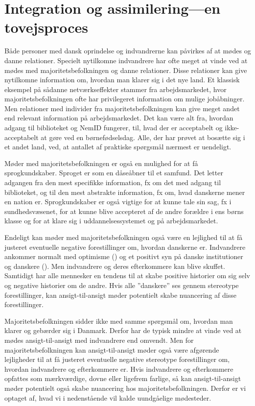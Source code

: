 \documentclass[
]{book}
\begin{document}
\section{Integration og assimilering---en tovejsproces}\label{integration-og-assimileringen-tovejsproces}

Både personer med dansk oprindelse og indvandrerne kan påvirkes af at mødes og danne relationer. Specielt nytilkomne indvandrere har ofte meget at vinde ved at mødes med majoritetsbefolkningen og danne relationer. Disse relationer kan give nytilkomne information om, hvordan man klarer sig i det nye land. Et klassisk eksempel på sådanne netværkseffekter stammer fra arbejdsmarkedet, hvor majoritetsbefolkningen ofte har privilegeret information om mulige jobåbninger. Men relationer med individer fra majoritetsbefolkningen kan give meget andet end relevant information på arbejdsmarkedet. Det kan være alt fra, hvordan adgang til biblioteket og NemID fungerer, til, hvad der er acceptabelt og ikke-acceptabelt at gøre ved en børnefødselsdag. Alle, der har prøvet at bosætte sig i et andet land, ved, at antallet af praktiske spørgsmål nærmest er uendeligt.

Møder med majoritetsbefolkningen er også en mulighed for at få sprogkundskaber. Sproget er som en dåseåbner til et samfund. Det letter adgangen fra den mest specifikke information, fx om det med adgang til biblioteket, og til den mest abstrakte information, fx om, hvad danskerne mener en nation er. Sprogkundskaber er også vigtige for at kunne tale sin sag, fx i sundhedsvæsenet, for at kunne blive accepteret af de andre forældre i ens børns klasse og for at klare sig i uddannelsessystemet og på arbejdsmarkedet.

Endeligt kan møder med majoritetsbefolkningen også være en lejlighed til at få justeret eventuelle negative forestillinger om, hvordan danskerne er. Indvandrere ankommer normalt med optimisme () og et positivt syn på danske institutioner og danskere (). Men indvandrere og deres efterkommere kan blive skuffet. Samtidigt har alle mennesker en tendens til at skabe positive historier om sig selv og negative historier om de andre. Hvis alle ''danskere'' ses gennem stereotype forestillinger, kan ansigt-til-ansigt møder potentielt skabe nuancering af disse forestillinger.

Majoritetsbefolkningen sidder ikke med samme spørgsmål om, hvordan man klarer og gebærder sig i Danmark. Derfor har de typisk mindre at vinde ved at mødes ansigt-til-ansigt med indvandrere end omvendt. Men for majoritetsbefolkningen kan ansigt-til-ansigt møder også være afgørende lejligheder til at få justeret eventuelle negative stereotype forestillinger om, hvordan indvandrere og efterkommere er. Hvis indvandrere og efterkommere opfattes som mærkværdige, dovne eller ligefrem farlige, så kan ansigt-til-ansigt møder potentielt også skabe nuancering hos majoritetsbefolkningen. Derfor er vi optaget af, hvad vi i nedenstående vil kalde uundgåelige mødesteder.
\end{document}
